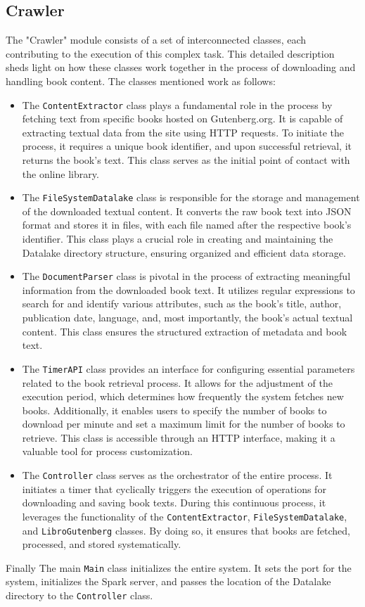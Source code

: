 \documentclass{article}
\begin{document}
\subsection{Crawler}

The "Crawler" module consists of a set of interconnected classes, each contributing to the execution of this complex task. This detailed description sheds light on how these classes work together in the process of downloading and handling book content.
The classes mentioned work as follows:
\begin{itemize}
\item
The \texttt{ContentExtractor} class plays a fundamental role in the process by fetching text from specific books hosted on Gutenberg.org. It is capable of extracting textual data from the site using HTTP requests. To initiate the process, it requires a unique book identifier, and upon successful retrieval, it returns the book's text. This class serves as the initial point of contact with the online library.
\item
The \texttt{FileSystemDatalake} class is responsible for the storage and management of the downloaded textual content. It converts the raw book text into JSON format and stores it in files, with each file named after the respective book's identifier. This class plays a crucial role in creating and maintaining the Datalake directory structure, ensuring organized and efficient data storage.
\item
The \texttt{DocumentParser} class is pivotal in the process of extracting meaningful information from the downloaded book text. It utilizes regular expressions to search for and identify various attributes, such as the book's title, author, publication date, language, and, most importantly, the book's actual textual content. This class ensures the structured extraction of metadata and book text.
\item
The \texttt{TimerAPI} class provides an interface for configuring essential parameters related to the book retrieval process. It allows for the adjustment of the execution period, which determines how frequently the system fetches new books. Additionally, it enables users to specify the number of books to download per minute and set a maximum limit for the number of books to retrieve. This class is accessible through an HTTP interface, making it a valuable tool for process customization.
\item
The \texttt{Controller} class serves as the orchestrator of the entire process. It initiates a timer that cyclically triggers the execution of operations for downloading and saving book texts. During this continuous process, it leverages the functionality of the \texttt{ContentExtractor}, \texttt{FileSystemDatalake}, and \texttt{LibroGutenberg} classes. By doing so, it ensures that books are fetched, processed, and stored systematically.
\end{itemize}
Finally The main \texttt{Main} class initializes the entire system. It sets the port for the system, initializes the Spark server, and passes the location of the Datalake directory to the \texttt{Controller} class.
\end{document}
